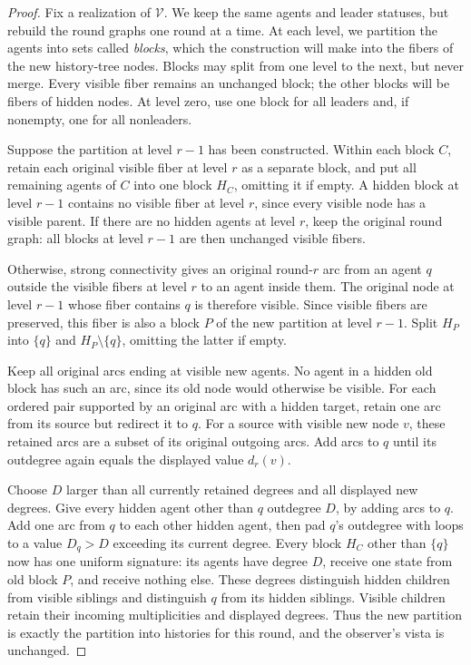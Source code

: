 \documentclass[11pt]{article}
\begin{document}
\begin{proof}
Fix a realization of \(\mathcal V\). We keep the same agents and
leader statuses, but rebuild the round graphs one round at a time.
At each level, we partition the agents into sets called
\emph{blocks}, which the construction will make into the fibers
of the new history-tree nodes. Blocks may split from one level
to the next, but never merge. Every visible fiber remains an
unchanged block; the other blocks will be fibers of hidden nodes.
At level zero, use one block for all leaders and, if nonempty,
one for all nonleaders.

Suppose the partition at level \(r-1\) has been constructed.
Within each block \(C\), retain each original visible fiber at
level \(r\) as a separate block, and put all remaining agents
of \(C\) into one block \(H_C\), omitting it if empty.
A hidden block at level \(r-1\) contains no visible fiber at
level \(r\), since every visible node has a visible parent.
If there are no hidden agents at level \(r\), keep the original
round graph: all blocks at level \(r-1\) are then unchanged
visible fibers.

Otherwise, strong connectivity gives an original round-\(r\) arc
from an agent \(q\) outside the visible fibers at level \(r\)
to an agent inside them. The original node at level \(r-1\)
whose fiber contains \(q\) is therefore visible.
Since visible fibers are preserved, this fiber is also a block
\(P\) of the new partition at level \(r-1\).
Split \(H_P\) into \(\{q\}\) and \(H_P\setminus\{q\}\),
omitting the latter if empty.

Keep all original arcs ending at visible new agents.  No agent
in a hidden old block has such an arc, since its old node would
otherwise be visible.  For each ordered pair supported by an
original arc with a hidden target, retain one arc from its source
but redirect it to \(q\).  For a source with visible new node
\(v\), these retained arcs are a subset of its original outgoing
arcs.  Add arcs to \(q\) until its outdegree again equals the
displayed value \(d_r(v)\).

Choose \(D\) larger than all currently retained degrees and all
displayed new degrees.  Give every hidden agent other than \(q\)
outdegree \(D\), by adding arcs to \(q\).  Add one arc from
\(q\) to each other hidden agent, then pad \(q\)'s outdegree
with loops to a value \(D_q>D\) exceeding its current degree.
Every block \(H_C\) other than \(\{q\}\) now has one uniform
signature: its agents have degree \(D\), receive one state from
old block \(P\), and receive nothing else.  These degrees
distinguish hidden children from visible siblings and distinguish
\(q\) from its hidden siblings.  Visible children retain their
incoming multiplicities and displayed degrees.  Thus the new
partition is exactly the partition into histories for this round,
and the observer's vista is unchanged.


\end{proof}
\end{document}
